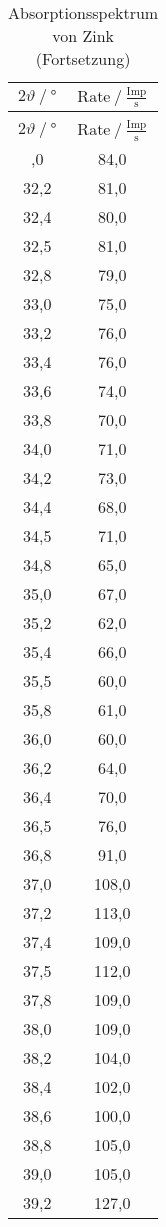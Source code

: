 \begin{longtable}{ S S }
   \caption{Absorptionsspektrum von Zink}
   \label{tab:zink} \\
    \toprule
 {$2\vartheta\:/\: \mathrm{°}$} & {$\text{Rate}\:/\: \mathrm{\frac{Imp}{s}}$} \\
    \midrule
  \endfirsthead
    \caption{Absorptionsspektrum von Zink (Fortsetzung)} \\
    \toprule
 {$2\vartheta\:/\: \mathrm{°}$} & {$\text{Rate}\:/\: \mathrm{\frac{Imp}{s}}$} \\
    \midrule
  \endhead
    \midrule
  \endfoot
    \bottomrule
  ,0 & 84,0 \\
    32,2 & 81,0 \\
    32,4 & 80,0 \\
    32,5 & 81,0 \\
    32,8 & 79,0 \\
    33,0 & 75,0 \\
    33,2 & 76,0 \\
    33,4 & 76,0 \\
    33,6 & 74,0 \\
    33,8 & 70,0 \\
    34,0 & 71,0 \\
    34,2 & 73,0 \\
    34,4 & 68,0 \\
    34,5 & 71,0 \\
    34,8 & 65,0 \\
    35,0 & 67,0 \\
    35,2 & 62,0 \\
    35,4 & 66,0 \\
    35,5 & 60,0 \\
    35,8 & 61,0 \\
    36,0 & 60,0 \\
    36,2 & 64,0 \\
    36,4 & 70,0 \\
    36,5 & 76,0 \\
    36,8 & 91,0 \\
    37,0 & 108,0 \\
    37,2 & 113,0 \\
    37,4 & 109,0 \\
    37,5 & 112,0 \\
    37,8 & 109,0 \\
    38,0 & 109,0 \\
    38,2 & 104,0 \\
    38,4 & 102,0 \\
    38,6 & 100,0 \\
    38,8 & 105,0 \\
    39,0 & 105,0 \\
    39,2 & 127,0 \\
\end{longtable}
